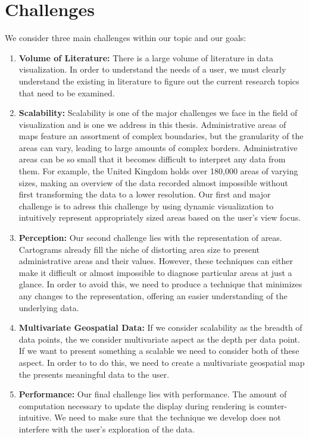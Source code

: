\section{Challenges}
We consider three main challenges within our topic and our goals:
\begin{enumerate}
\item \textbf{Volume of Literature:} There is a large volume of literature in data visualization. In order to understand the needs of a user, we must clearly understand the existing in literature to figure out the current research topics that need to be examined. 
\item \textbf{Scalability:} Scalability is one of the major challenges we face in the field of visualization and is one we address in this thesis. Administrative areas of maps feature an assortment of complex boundaries, but the granularity of the areas can vary, leading to large amounts of complex borders. Administrative areas can be so small that it becomes difficult to interpret any data from them. For example, the United Kingdom holds over 180,000 areas of varying sizes, making an overview of the data recorded almost impossible without first transforming the data to a lower resolution. Our first and major challenge is to adress this challenge by using dynamic visualization to intuitively represent appropriately sized areas based on the user's view focus.
\item \textbf{Perception:} Our second challenge lies with the representation of areas. Cartograms already fill the niche of distorting area size to present administrative areas and their values. However, these techniques can either make it difficult or almost impossible to diagnose particular areas at just a glance. In order to avoid this, we need to produce a technique that minimizes any changes to the representation, offering an easier understanding of the underlying data.
\item \textbf{Multivariate Geospatial Data:} If we consider scalability as the breadth of data points, the we consider multivariate aspect as the depth per data point. If we want to present something a scalable we need to consider both of these aspect. In order to to do this, we need to create a multivariate geospatial map the presents meaningful data to the user.
\item \textbf{Performance:} Our final challenge lies with performance. The amount of computation necessary to update the display during rendering is counter-intuitive. We need to make sure that the technique we develop does not interfere with the user's exploration of the data.
\end{enumerate}

